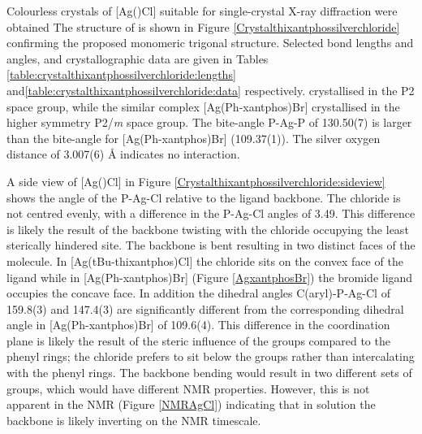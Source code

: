 Colourless crystals of [Ag(\tButhixantphos)Cl] suitable for single-crystal X-ray diffraction were obtained   The structure of  is shown in Figure \ref{Crystalthixantphossilverchloride} confirming the proposed monomeric trigonal structure.  Selected bond lengths and angles, and crystallographic data are given in Tables \ref{table:crystalthixantphossilverchloride:lengths} and\ref{table:crystalthixantphossilverchloride:data} respectively.   crystallised in the P2 space group, while the similar complex [Ag(Ph-xantphos)Br] crystallised in the higher symmetry P2/\emph{m} space group.  The bite-angle P-Ag-P of 130.50(7) is larger than the bite-angle for [Ag(Ph-xantphos)Br] (109.37(1)).  The silver oxygen distance of 3.007(6) \si{\angstrom} indicates no interaction. 

A side view of [Ag(\tButhixantphos)Cl] in Figure \ref{Crystalthixantphossilverchloride:sideview} shows the angle of the P-Ag-Cl relative to the ligand backbone.   The chloride is not centred evenly, with a difference in the P-Ag-Cl angles of 3.49\degrees.  This difference is likely the result of the backbone twisting with the chloride occupying the least sterically hindered site.  The backbone is bent resulting in two distinct faces of the molecule.  In [Ag(tBu-thixantphos)Cl] the chloride sits on the convex face of the ligand while in [Ag(Ph-xantphos)Br] (Figure \ref{AgxantphosBr}) the bromide ligand occupies the concave face.  In addition the dihedral angles C(aryl)-P-Ag-Cl of 159.8(3) and 147.4(3) are significantly different from the corresponding dihedral angle in [Ag(Ph-xantphos)Br] of 109.6(4).  This difference in the coordination plane is likely the result of the steric influence of the \tBu{} groups compared to the phenyl rings; the chloride prefers to sit below the \tBu{} groups rather than intercalating with the phenyl rings.  The backbone bending would result in two different sets of \tBu{} groups, which would have different NMR properties.  However, this is not apparent in the NMR (Figure \ref{NMRAgCl}) indicating that in solution the backbone is likely inverting on the NMR timescale.  



